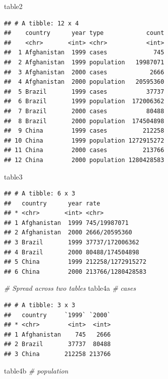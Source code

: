 \documentclass[
]{book}
\newenvironment{Shaded}{\begin{snugshade}}{\end{snugshade}}
\newcommand{\CommentTok}[1]{\textcolor[rgb]{0.56,0.35,0.01}{\textit{#1}}}
\newcommand{\NormalTok}[1]{#1}
\begin{document}
\begin{Shaded}
\begin{Highlighting}[]
\NormalTok{table2}
\end{Highlighting}
\end{Shaded}

\begin{verbatim}
## # A tibble: 12 x 4
##    country      year type            count
##    <chr>       <int> <chr>           <int>
##  1 Afghanistan  1999 cases             745
##  2 Afghanistan  1999 population   19987071
##  3 Afghanistan  2000 cases            2666
##  4 Afghanistan  2000 population   20595360
##  5 Brazil       1999 cases           37737
##  6 Brazil       1999 population  172006362
##  7 Brazil       2000 cases           80488
##  8 Brazil       2000 population  174504898
##  9 China        1999 cases          212258
## 10 China        1999 population 1272915272
## 11 China        2000 cases          213766
## 12 China        2000 population 1280428583
\end{verbatim}

\begin{Shaded}
\begin{Highlighting}[]
\NormalTok{table3}
\end{Highlighting}
\end{Shaded}

\begin{verbatim}
## # A tibble: 6 x 3
##   country      year rate             
## * <chr>       <int> <chr>            
## 1 Afghanistan  1999 745/19987071     
## 2 Afghanistan  2000 2666/20595360    
## 3 Brazil       1999 37737/172006362  
## 4 Brazil       2000 80488/174504898  
## 5 China        1999 212258/1272915272
## 6 China        2000 213766/1280428583
\end{verbatim}

\begin{Shaded}
\begin{Highlighting}[]
\CommentTok{\# Spread across two tables}
\NormalTok{table4a  }\CommentTok{\# cases}
\end{Highlighting}
\end{Shaded}

\begin{verbatim}
## # A tibble: 3 x 3
##   country     `1999` `2000`
## * <chr>        <int>  <int>
## 1 Afghanistan    745   2666
## 2 Brazil       37737  80488
## 3 China       212258 213766
\end{verbatim}

\begin{Shaded}
\begin{Highlighting}[]
\NormalTok{table4b  }\CommentTok{\# population}
\end{Highlighting}
\end{Shaded}
\end{document}

